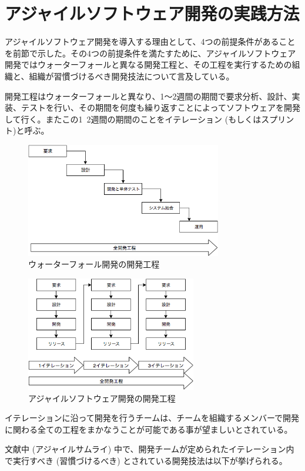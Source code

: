 \section{アジャイルソフトウェア開発の実践方法}

アジャイルソフトウェア開発を導入する理由として、4つの前提条件があることを前節で示した。その4つの前提条件を満たすために、アジャイルソフトウェア開発ではウォーターフォールと異なる開発工程と、その工程を実行するための組織と、組織が習慣づけるべき開発技法について言及している。

開発工程はウォーターフォールと異なり、1〜2週間の期間で要求分析、設計、実装、テストを行い、その期間を何度も繰り返すことによってソフトウェアを開発して行く。またこの1~2週間の期間のことをイテレーション (もしくはスプリント)と呼ぶ。

\begin{figure}[H]
\centering
\includegraphics[height=5cm]{./assets/images/waterfall.png}
\caption{ウォーターフォール開発の開発工程}
\label{fig:waterfall}
\end{figure}

\begin{figure}[H]
\centering
\includegraphics[height=5cm]{./assets/images/agile.png}
\caption{アジャイルソフトウェア開発の開発工程}
\label{fig:agile}
\end{figure}


イテレーションに沿って開発を行うチームは、チームを組織するメンバーで開発に関わる全ての工程をまかなうことが可能である事が望ましいとされている。

文献中 (アジャイルサムライ) 中で、開発チームが定められたイテレーション内で実行すべき (習慣づけるべき) とされている開発技法は以下が挙げられる。

